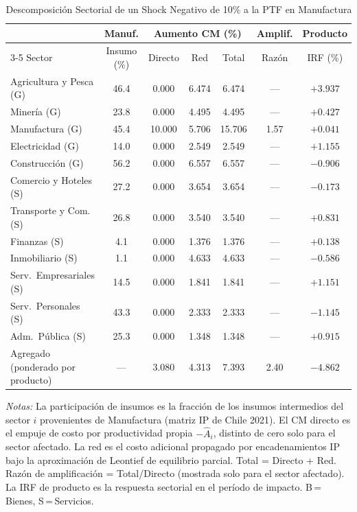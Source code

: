 \begin{table}[htbp]
\centering
\caption{Descomposición Sectorial de un Shock Negativo de 10\% a la PTF en Manufactura}
\label{tab:mfg_decomp}
\begin{threeparttable}
\small
\begin{tabular}{@{}l c c c c c c@{}}
\toprule
 & Manuf. & \multicolumn{3}{c}{Aumento CM (\%)} & Amplif. & Producto \\
\cmidrule(lr){3-5}
Sector & Insumo (\%) & Directo & Red & Total & Razón & IRF (\%) \\
\midrule
Agricultura y Pesca (G) & 46.4 & 0.000 & 6.474 & 6.474 & --- & $+3.937$ \\
Minería (G) & 23.8 & 0.000 & 4.495 & 4.495 & --- & $+0.427$ \\
Manufactura (G) & 45.4 & 10.000 & 5.706 & 15.706 &  1.57 & $+0.041$ \\
Electricidad (G) & 14.0 & 0.000 & 2.549 & 2.549 & --- & $+1.155$ \\
Construcción (G) & 56.2 & 0.000 & 6.557 & 6.557 & --- & $-0.906$ \\
Comercio y Hoteles (S) & 27.2 & 0.000 & 3.654 & 3.654 & --- & $-0.173$ \\
Transporte y Com. (S) & 26.8 & 0.000 & 3.540 & 3.540 & --- & $+0.831$ \\
Finanzas (S) &  4.1 & 0.000 & 1.376 & 1.376 & --- & $+0.138$ \\
Inmobiliario (S) &  1.1 & 0.000 & 4.633 & 4.633 & --- & $-0.586$ \\
Serv.\ Empresariales (S) & 14.5 & 0.000 & 1.841 & 1.841 & --- & $+1.151$ \\
Serv.\ Personales (S) & 43.3 & 0.000 & 2.333 & 2.333 & --- & $-1.145$ \\
Adm.\ Pública (S) & 25.3 & 0.000 & 1.348 & 1.348 & --- & $+0.915$ \\
\midrule
Agregado (ponderado por producto) & --- & 3.080 & 4.313 & 7.393 &  2.40 & $-4.862$ \\
\bottomrule
\end{tabular}
\begin{tablenotes}[flushleft]
\footnotesize
\item \textit{Notas:} La participación de insumos es la fracción de los insumos intermedios del sector $i$ provenientes de Manufactura (matriz IP de Chile 2021). El CM directo es el empuje de costo por productividad propia $-\hat A_i$, distinto de cero solo para el sector afectado. La red es el costo adicional propagado por encadenamientos IP bajo la aproximación de Leontief de equilibrio parcial. Total = Directo + Red. Razón de amplificación = Total/Directo (mostrada solo para el sector afectado). La IRF de producto es la respuesta sectorial en el período de impacto. B\,=\,Bienes, S\,=\,Servicios.
\end{tablenotes}
\end{threeparttable}
\end{table}
